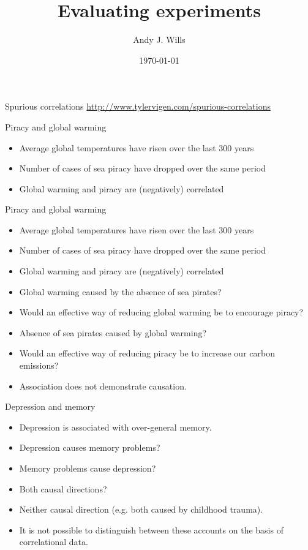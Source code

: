 \documentclass{beamer}
\title[Critical Thinking]{Evaluating experiments}
\author{Andy J. Wills}
\date{\today}
\begin{document}
\frame{\titlepage}

\begin{frame}{Spurious correlations}
	\url{http://www.tylervigen.com/spurious-correlations}
\end{frame}

\begin{frame}{Piracy and global warming}
\begin{itemize}
\item Average global temperatures have risen over the last 300 years
\item Number of cases of sea piracy have dropped over the same period
\item Global warming and piracy are (negatively) correlated
\vspace{12 pt}
\end{itemize}
\end{frame}

\begin{frame}{Piracy and global warming}
\begin{itemize}
\item Average global temperatures have risen over the last 300 years
\item Number of cases of sea piracy have dropped over the same period
\item Global warming and piracy are (negatively) correlated
\vspace{12 pt}
\item Global warming caused by the absence of sea pirates? 
\item Would an effective way of reducing global warming be to encourage piracy?
\vspace{12 pt}
\item Absence of sea pirates caused by global warming? 
\item Would an effective way of reducing piracy be to increase our carbon emissions?
\vspace{12 pt}
\item Association does not demonstrate causation. 
\end{itemize}
\end{frame}

\begin{frame}{Depression and memory}
\begin{itemize}
\item Depression is associated with over-general memory.
\vspace{12 pt}
\item Depression causes memory problems? 
\item Memory problems cause depression?
\item Both causal directions?
\item Neither causal direction (e.g. both caused by childhood trauma). 
\vspace{12 pt}
\item It is not possible to distinguish between these accounts on the basis of correlational data.
\end{itemize}
\end{frame}
\end{document}
